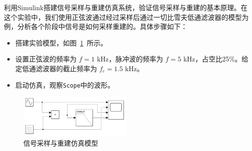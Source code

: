 \documentclass[lang=cn,newtx,10pt,scheme=chinese]{elegantbook}
\begin{document}
利用Simulink搭建信号采样与重建仿真系统，验证信号采样与重建的基本原理。在这个实验中，我们使用正弦波通过经过采样后通过一切比雪夫低通滤波器的模型为例，分析各个阶段中信号是如何采样重建的。具体步骤如下：
\begin{itemize}
  \item 搭建实验模型，如图~\ref{fig:model1}~所示。
  \item 设置正弦波的频率为 $f = 1$ kHz，脉冲波的频率为 $f = 5$ kHz，占空比25\%。给定低通滤波器的截止频率为 $f_c = 1.5$ kHz。
  \item 启动仿真，观察\lstinline{Scope}中的波形。
\end{itemize}
\begin{figure}[htbp]
  \centering
  \includegraphics[width=0.5\textwidth]{figure/exp1/model1.png}
  \caption{信号采样与重建仿真模型}
  \label{fig:model1}
\end{figure}
\end{document}
